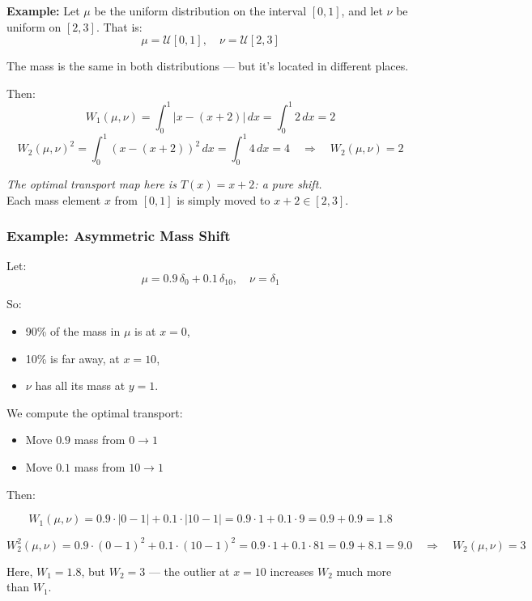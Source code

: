 \documentclass[11pt]{article}
\begin{document}
\vspace{0.5em}
\textbf{Example:} Let $\mu$ be the uniform distribution on the interval $[0, 1]$, and let $\nu$ be uniform on $[2, 3]$. That is:
\[
\mu = \mathcal{U}[0, 1], \quad \nu = \mathcal{U}[2, 3]
\]

The mass is the same in both distributions — but it's located in different places.

Then:
\[
W_1(\mu, \nu) = \int_0^1 |x - (x + 2)|\,dx = \int_0^1 2\,dx = 2
\]
\[
W_2(\mu, \nu)^2 = \int_0^1 (x - (x + 2))^2 \, dx = \int_0^1 4 \, dx = 4 \quad \Rightarrow \quad W_2(\mu, \nu) = 2
\]

\begin{center}
\textit{The optimal transport map here is $T(x) = x + 2$: a pure shift.}\\
Each mass element $x$ from $[0,1]$ is simply moved to $x+2 \in [2,3]$.
\end{center}

\subsubsection*{Example: Asymmetric Mass Shift}

Let:
\[
\mu = 0.9\,\delta_0 + 0.1\,\delta_{10}, \quad \nu = \delta_1
\]

So:
\begin{itemize}
  \item 90\% of the mass in $\mu$ is at $x = 0$,
  \item 10\% is far away, at $x = 10$,
  \item $\nu$ has all its mass at $y = 1$.
\end{itemize}

We compute the optimal transport:

\begin{itemize}
  \item Move $0.9$ mass from $0 \to 1$
  \item Move $0.1$ mass from $10 \to 1$
\end{itemize}

Then:

\[
W_1(\mu, \nu) = 0.9 \cdot |0 - 1| + 0.1 \cdot |10 - 1| = 0.9 \cdot 1 + 0.1 \cdot 9 = 0.9 + 0.9 = 1.8
\]

\[
W_2^2(\mu, \nu) = 0.9 \cdot (0 - 1)^2 + 0.1 \cdot (10 - 1)^2 = 0.9 \cdot 1 + 0.1 \cdot 81 = 0.9 + 8.1 = 9.0
\quad \Rightarrow \quad W_2(\mu, \nu) = 3
\]

\begin{tcolorbox}[colback=blue!2!white, colframe=blue!90!black, title=Conclusion]
Here, $W_1 = 1.8$, but $W_2 = 3$ — the outlier at $x = 10$ increases $W_2$ much more than $W_1$.
\end{tcolorbox}
\end{document}
